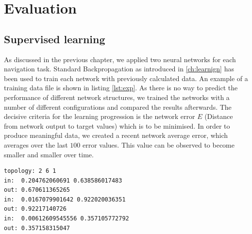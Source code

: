 \documentclass[10pt,a4paper,DIV=11]{scrreprt}
\begin{document}
\chapter{Evaluation}
\label{ch:eval}

\section{Supervised learning}

As discussed in the previous chapter, we applied two neural networks for each navigation task. Standard Backpropagation as introduced in \ref{ch:learnign} has been used
to train each network with previously calculated data. An example of a training data file is shown in listing \ref{lst:exp}. As there is no way to predict the performance 
of different network structures, we trained the networks with a number of different configurations and compared the results afterwards. The decisive criteria for the
learning progression is the network error $E$ (Distance from network output to target values) which is to be minimised. In order to produce meaningful data, we created
a recent network average error, which averages over the last $100$ error values. This value can be observed to become smaller and smaller over time. 

\begin{lstlisting}[caption={An example of data used to train $net_v$ with Backpropagation.},label={lst:exp},stepnumber=1]
topology: 2 6 1
in:  0.204762060691 0.638586017483
out: 0.670611365265
in:  0.0167079901642 0.922020036351
out: 0.92217140726
in:  0.00612609545556 0.357105772792
out: 0.357158315047
\end{lstlisting}
\end{document}
